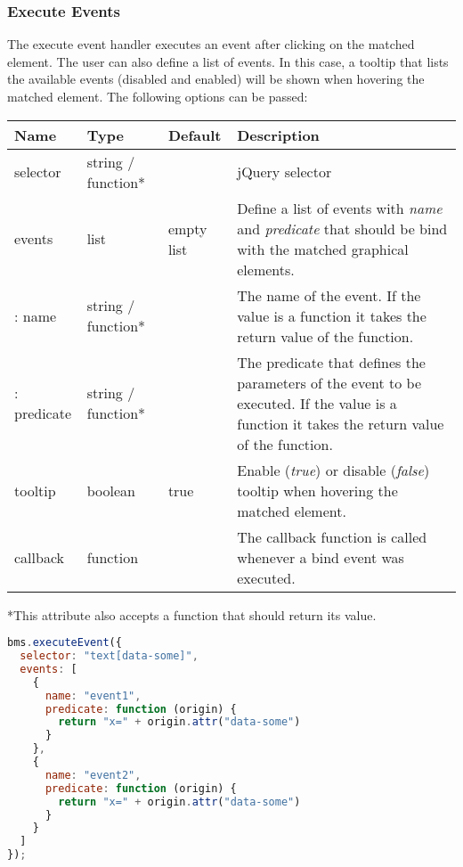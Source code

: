 \subsubsection{Execute Events}

The execute event handler executes an event after clicking on the matched element.
The user can also define a list of events.
In this case, a tooltip that lists the available events (disabled and enabled) will be shown when hovering the matched element.
The following options can be passed:

\vspace{0.5cm}
\begin{tabular}{ l l l p{7cm} }
  \textbf{Name} & \textbf{Type} & \textbf{Default} & \textbf{Description} \\
  \hline\noalign{\medskip}
  selector & string / function* & & jQuery selector \\
  \hline\noalign{\medskip}  
  events & list & empty list & Define a list of events with \textit{name} and \textit{predicate} that should be bind with the matched graphical elements. \\
  \hline\noalign{\medskip}
  : name & string / function* & & The name of the event. If the value is a function it takes the return value of the function.\\
  \hline\noalign{\medskip}
  : predicate & string / function* & & The predicate that defines the parameters of the event to be executed. If the value is a function it takes the return value of the function.\\
  \hline\noalign{\medskip}
  tooltip & boolean & true & Enable (\textit{true}) or disable (\textit{false}) tooltip when hovering the matched element.\\
  \hline\noalign{\medskip}
  callback & function &  & The callback function is called whenever a bind event was executed.
\end{tabular}

*This attribute also accepts a function that should return its value.

\begin{lstlisting}[language=JavaScript]
bms.executeEvent({
  selector: "text[data-some]",
  events: [
    { 
      name: "event1", 
      predicate: function (origin) {
        return "x=" + origin.attr("data-some") 
      }
    },
    {
      name: "event2", 
      predicate: function (origin) {
        return "x=" + origin.attr("data-some")
      }
    } 
  ]
});
\end{lstlisting}
